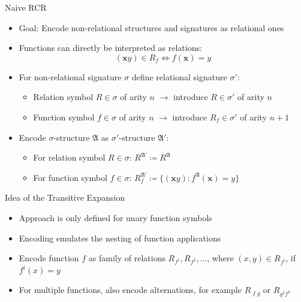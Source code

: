 \documentclass[aspectratio=169]{beamer}
\newcommand{\term}[1]{\operatorname{\mathit{#1}}}
\begin{document}
	\begin{frame}{Naive RCR}
		\begin{itemize}
			\item Goal: Encode non-relational structures and signatures as relational ones
			\item Functions can directly be interpreted as relations:
			$$(\mathbf xy)\in R_f \Longleftrightarrow f(\mathbf x)=y$$
			\item For non-relational signature $\sigma$ define relational signature $\sigma'$:
			\begin{itemize}
				\item Relation symbol $R\in\sigma$ of arity $n$ $\rightarrow$ introduce $R\in\sigma'$ of arity $n$
				\item Function symbol $f\in\sigma$ of arity $n$ $\rightarrow$ introduce $R_f\in\sigma'$ of arity $n+1$
			\end{itemize}
			\item Encode $\sigma$-structure $\mathfrak A$ as $\sigma'$-structure $\mathfrak A'$:
			\begin{itemize}
				\item For relation symbol $R\in\sigma$: $R^{\mathfrak A'}\coloneqq R^{\mathfrak A}$
				\item For function symbol $f\in \sigma$: $R_f^{\mathfrak A'}\coloneqq \{(\mathbf xy) : f^{\mathfrak A}(\mathbf x)=y\}$
			\end{itemize}
		\end{itemize}
	\end{frame}
	
	\begin{frame}{Idea of the Transitive Expansion}
		\begin{itemize}
			\item Approach is only defined for unary function symbols
			\item Encoding emulates the nesting of function applications
			\item Encode function $f$ as family of relations $R_{f^1},R_{f^2},\dots$, where $(x,y)\in R_{f^i}$, if $f^i(x)=y$
			\item For multiple functions, also encode alternations, for example $R_{\term fg}$ or $R_{g^2f^3}$
		\end{itemize}
	\end{frame}
	
\end{document}
